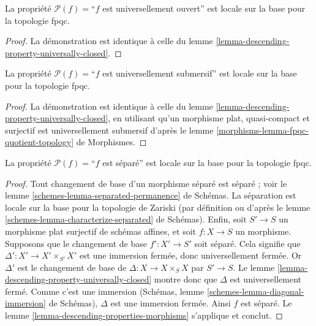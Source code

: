 \begin{lemma}
\label{lemma-descending-property-universally-open}
La propriété $\mathcal{P}(f) =$``$f$ est universellement ouvert'' est locale
sur la base pour la topologie fpqc.
\end{lemma}

\begin{proof}
La démonstration est identique à celle du
lemme \ref{lemma-descending-property-universally-closed}.
\end{proof}

\begin{lemma}
\label{lemma-descending-property-universally-submersive}
La propriété $\mathcal{P}(f) =$``$f$ est universellement submersif'' est
locale sur la base pour la topologie fpqc.
\end{lemma}

\begin{proof}
La démonstration est identique à celle du
lemme \ref{lemma-descending-property-universally-closed}, en utilisant qu'un
morphisme plat, quasi-compact et surjectif est universellement submersif
d'après le lemme \ref{morphisms-lemma-fpqc-quotient-topology} de Morphismes.
\end{proof}

\begin{lemma}
\label{lemma-descending-property-separated}
La propriété $\mathcal{P}(f) =$``$f$ est séparé'' est locale sur la base pour
la topologie fpqc.
\end{lemma}

\begin{proof}
Tout changement de base d'un morphisme séparé est séparé ; voir le lemme
\ref{schemes-lemma-separated-permanence} de Schémas. La séparation est locale sur
la base pour la topologie de Zariski (par définition ou d'après le lemme
\ref{schemes-lemma-characterize-separated} de Schémas). Enfin, soit $S' \to S$ un
morphisme plat surjectif de schémas affines, et soit $f : X \to S$ un
morphisme. Supposons que le changement de base $f' : X' \to S'$ soit séparé.
Cela signifie que $\Delta' : X' \to X'\times_{S'} X'$ est une immersion
fermée, donc universellement fermée. Or $\Delta'$ est le changement de base
de $\Delta : X \to X \times_S X$ par $S' \to S$. Le
lemme \ref{lemma-descending-property-universally-closed} montre donc que
$\Delta$ est universellement fermé. Comme c'est une immersion (Schémas,
lemme \ref{schemes-lemma-diagonal-immersion} de Schémas), $\Delta$ est une immersion
fermée. Ainsi $f$ est séparé. Le
lemme \ref{lemma-descending-properties-morphisms} s'applique et conclut.
\end{proof}

